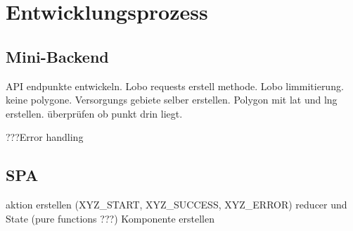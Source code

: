 \section{Entwicklungsprozess}
\subsection{Mini-Backend}
API endpunkte entwickeln.
Lobo requests erstell methode.
Lobo limmitierung. keine polygone. Versorgungs gebiete selber erstellen. Polygon mit lat und lng erstellen. überprüfen ob punkt drin liegt.

???Error handling


\subsection{SPA}
aktion erstellen (XYZ_START, XYZ_SUCCESS, XYZ_ERROR)
reducer und State (pure functions ???)
Komponente erstellen



